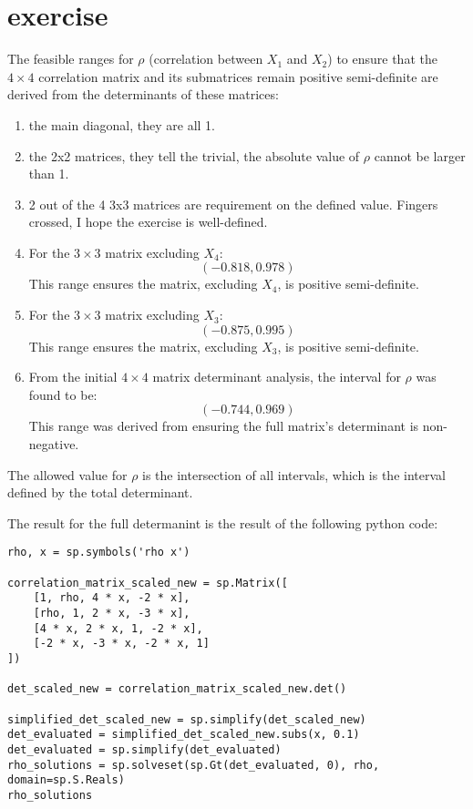 \documentclass{article}
\begin{document}
\section{exercise}
The feasible ranges for \( \rho \) (correlation between \( X_1 \) and \( X_2 \)) to ensure that the \(4 \times 4\) correlation matrix and its submatrices remain positive semi-definite are derived from the determinants of these matrices:

\begin{enumerate}
    \item the main diagonal, they are all 1.
    \item the 2x2 matrices, they tell the trivial,
          the absolute value of $\rho$ cannot be larger than 1.
    \item 2 out of the 4 3x3 matrices are requirement on the defined value.
          Fingers crossed, I hope the exercise is well-defined.
    \item For the \(3 \times 3\) matrix excluding \(X_4\):
          \[
              (-0.818, 0.978)
          \]
          This range ensures the matrix, excluding \(X_4\), is positive semi-definite.

    \item For the \(3 \times 3\) matrix excluding \(X_3\):
          \[
              (-0.875, 0.995)
          \]
          This range ensures the matrix, excluding \(X_3\), is positive semi-definite.

    \item From the initial \(4 \times 4\) matrix determinant analysis, the interval for \( \rho \) was found to be:
          \[
              (-0.744, 0.969)
          \]
          This range was derived from ensuring the full matrix's determinant is non-negative.
\end{enumerate}
The allowed value for $\rho$ is the intersection of all intervals,
which is the interval defined by the total determinant.

The result for the full determanint is the result of the following python code:
\begin{lstlisting}
rho, x = sp.symbols('rho x')

correlation_matrix_scaled_new = sp.Matrix([
    [1, rho, 4 * x, -2 * x],
    [rho, 1, 2 * x, -3 * x],
    [4 * x, 2 * x, 1, -2 * x],
    [-2 * x, -3 * x, -2 * x, 1]
])

det_scaled_new = correlation_matrix_scaled_new.det()

simplified_det_scaled_new = sp.simplify(det_scaled_new)
det_evaluated = simplified_det_scaled_new.subs(x, 0.1)
det_evaluated = sp.simplify(det_evaluated)
rho_solutions = sp.solveset(sp.Gt(det_evaluated, 0), rho, domain=sp.S.Reals)
rho_solutions

\end{lstlisting}
\end{document}

